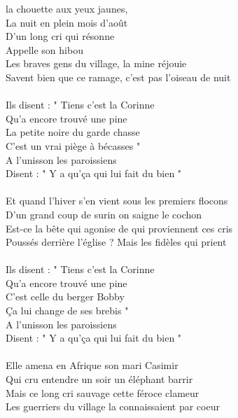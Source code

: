 %
 la chouette aux yeux jaunes,
\\La nuit en plein mois d'août
\\D'un long cri qui résonne
\\Appelle son hibou
\\Les braves gens du village, la mine réjouie
\\Savent bien que ce ramage, c'est pas l'oiseau de nuit
\\\\Ils disent : " Tiens c'est la Corinne
\\Qu'a encore trouvé une pine
\\La petite noire du garde chasse
\\C'est un vrai piège à bécasses "
\\A l'unisson les paroissiens
\\Disent : " Y a qu'ça qui lui fait du bien "
\\\\Et quand l'hiver s'en vient sous les premiers flocons
\\D'un grand coup de surin on saigne le cochon
\\Est-ce la bête qui agonise de qui proviennent ces cris
\\Poussés derrière l'église ? Mais les fidèles qui prient
\\\\Ils disent : " Tiens c'est la Corinne
\\Qu'a encore trouvé une pine
\\C'est celle du berger Bobby
\\Ça lui change de ses brebis "
\\A l'unisson les paroissiens
\\Disent : " Y a qu'ça qui lui fait du bien "
\\\\Elle amena en Afrique son mari Casimir
\\Qui cru entendre un soir un éléphant barrir
\\Mais ce long cri sauvage cette féroce clameur
\\Les guerriers du village la connaissaient par coeur
